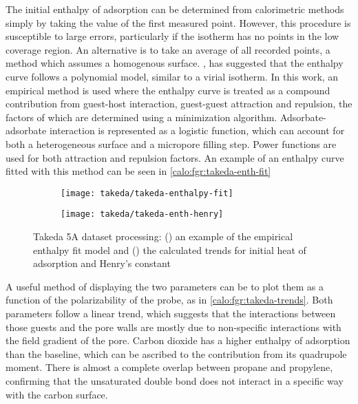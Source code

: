The initial enthalpy of adsorption can be determined from calorimetric 
methods simply by taking the value of the first measured point.
However, this procedure is susceptible to large errors, particularly
if the isotherm has no points in the low coverage region. An alternative
is to take an average of all recorded points, a method which assumes
a homogenous surface. \citet{myersThermodynamicsAdsorptionPorous2002},
has suggested that the enthalpy curve follows a polynomial model, similar
to a virial isotherm.
In this work, an empirical method is used where the enthalpy curve
is treated as a compound contribution from guest-host interaction,
guest-guest attraction and repulsion, the factors of which are determined
using a minimization algorithm. Adsorbate-adsorbate interaction is 
represented as a logistic function, which can account for both 
a heterogeneous surface and a micropore filling step. Power functions
are used for both attraction and repulsion factors. An example of 
an enthalpy curve fitted with this method can be seen 
in \autoref{calo:fgr:takeda-enth-fit}

\begin{figure}[ht]

	\centering
	\begin{subfigure}[b]{.5\textwidth}
		\centering
		\texttt{[image: takeda/takeda-enthalpy-fit]}
		\caption{}%
		\label{calo:fgr:takeda-enth-fit}
	\end{subfigure}%
	\begin{subfigure}[b]{.5\textwidth}
		\centering
		\texttt{[image: takeda/takeda-enth-henry]}
		\caption{}%
		\label{calo:fgr:takeda-trends}
	\end{subfigure}
	\caption{Takeda 5A dataset processing: (\protect{})
	 an example of the empirical enthalpy fit model and (\protect{}) the calculated
		trends for initial heat of adsorption and Henry's constant}%
	\label{calo:fgr:takeda-analysis}

\end{figure}

A useful method of displaying the two parameters can be to plot them
as a function of the polarizability of the probe, as in
\autoref{calo:fgr:takeda-trends}. Both parameters follow a linear
trend, which suggests that the interactions between those guests and the
pore walls are mostly due to non-specific interactions with the field
gradient of the pore. Carbon dioxide has a higher enthalpy
of adsorption than the baseline, which can be ascribed to the contribution 
from its quadrupole moment. There is almost a complete overlap between 
propane and propylene, confirming that the unsaturated double bond does not
interact in a specific way with the carbon surface.


